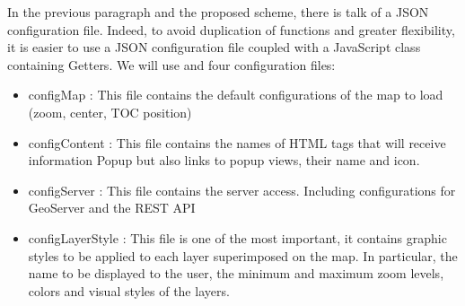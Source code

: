 


In the previous paragraph and the proposed scheme, there is talk of a JSON configuration file. Indeed, to avoid duplication of functions and greater flexibility, it is easier to use a JSON configuration file coupled with a JavaScript class containing Getters. We will use and four configuration files:

\begin{itemize}
  \item configMap : This file contains the default configurations of the map to load (zoom, center, TOC position)
  \item configContent : This file contains the names of HTML tags that will receive information Popup but also links to popup views, their name and icon.
  \item configServer : This file contains the server access. Including configurations for GeoServer and the REST API
  \item configLayerStyle : This file is one of the most important, it contains graphic styles to be applied to each layer superimposed on the map. In particular, the name to be displayed to the user, the minimum and maximum zoom levels, colors and visual styles of the layers.
\end{itemize}

